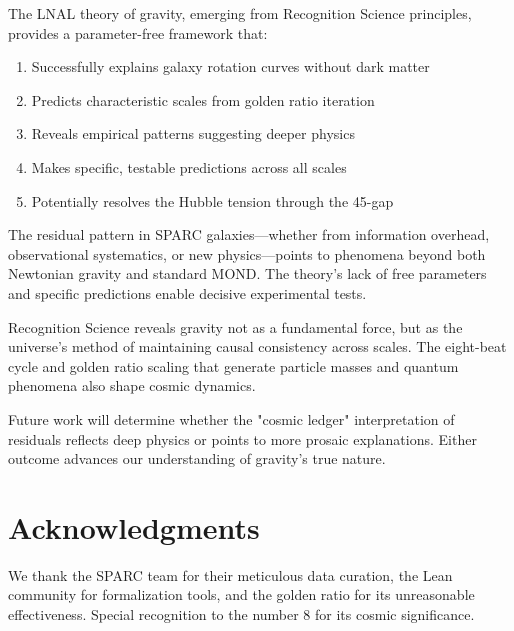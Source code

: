 \documentclass[12pt,a4paper]{article}
\begin{document}
The LNAL theory of gravity, emerging from Recognition Science principles, provides a parameter-free framework that:

\begin{enumerate}
\item Successfully explains galaxy rotation curves without dark matter
\item Predicts characteristic scales from golden ratio iteration  
\item Reveals empirical patterns suggesting deeper physics
\item Makes specific, testable predictions across all scales
\item Potentially resolves the Hubble tension through the 45-gap
\end{enumerate}

The residual pattern in SPARC galaxies—whether from information overhead, observational systematics, or new physics—points to phenomena beyond both Newtonian gravity and standard MOND. The theory's lack of free parameters and specific predictions enable decisive experimental tests.

Recognition Science reveals gravity not as a fundamental force, but as the universe's method of maintaining causal consistency across scales. The eight-beat cycle and golden ratio scaling that generate particle masses and quantum phenomena also shape cosmic dynamics.

Future work will determine whether the "cosmic ledger" interpretation of residuals reflects deep physics or points to more prosaic explanations. Either outcome advances our understanding of gravity's true nature.

\section*{Acknowledgments}

We thank the SPARC team for their meticulous data curation, the Lean community for formalization tools, and the golden ratio for its unreasonable effectiveness. Special recognition to the number 8 for its cosmic significance.
\end{document}
